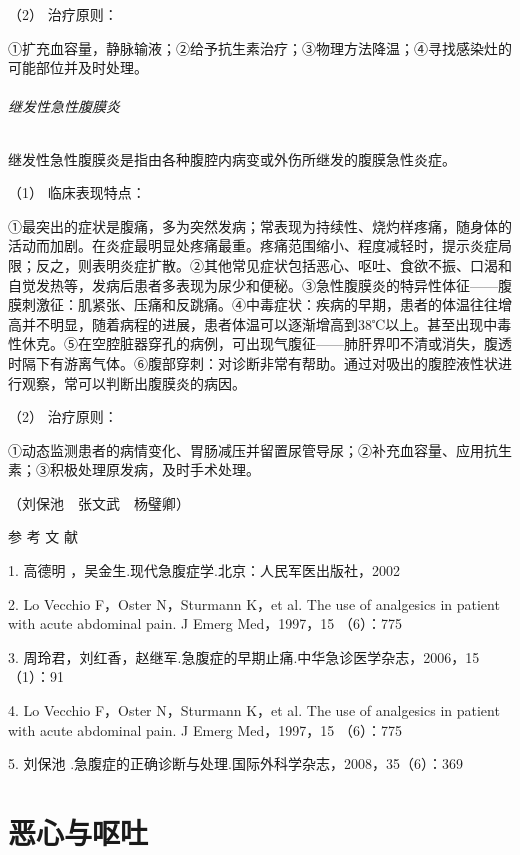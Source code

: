 \hypertarget{text00026.htmlux5cux23CHP1-10-3-2-2-2}{}
（2） 治疗原则：

①扩充血容量，静脉输液；②给予抗生素治疗；③物理方法降温；④寻找感染灶的可能部位并及时处理。

\subparagraph{继发性急性腹膜炎}

继发性急性腹膜炎是指由各种腹腔内病变或外伤所继发的腹膜急性炎症。

\hypertarget{text00026.htmlux5cux23CHP1-10-3-2-3-1}{}
（1） 临床表现特点：

①最突出的症状是腹痛，多为突然发病；常表现为持续性、烧灼样疼痛，随身体的活动而加剧。在炎症最明显处疼痛最重。疼痛范围缩小、程度减轻时，提示炎症局限；反之，则表明炎症扩散。②其他常见症状包括恶心、呕吐、食欲不振、口渴和自觉发热等，发病后患者多表现为尿少和便秘。③急性腹膜炎的特异性体征------腹膜刺激征：肌紧张、压痛和反跳痛。④中毒症状：疾病的早期，患者的体温往往增高并不明显，随着病程的进展，患者体温可以逐渐增高到38℃以上。甚至出现中毒性休克。⑤在空腔脏器穿孔的病例，可出现气腹征------肺肝界叩不清或消失，腹透时隔下有游离气体。⑥腹部穿刺：对诊断非常有帮助。通过对吸出的腹腔液性状进行观察，常可以判断出腹膜炎的病因。

\hypertarget{text00026.htmlux5cux23CHP1-10-3-2-3-2}{}
（2） 治疗原则：

①动态监测患者的病情变化、胃肠减压并留置尿管导尿；②补充血容量、应用抗生素；③积极处理原发病，及时手术处理。

（刘保池　张文武　杨璧卿）

\protect\hypertarget{text00027.html}{}{}

\hypertarget{text00027.htmlux5cux23CHP1-10-4}{}
参 考 文 献

1. 高德明 ，吴金生.现代急腹症学.北京：人民军医出版社，2002

2. Lo Vecchio F，Oster N，Sturmann K，et al. The use of analgesics in
patient with acute abdominal pain. J Emerg Med，1997，15 （6）：775

3.
周玲君，刘红香，赵继军.急腹症的早期止痛.中华急诊医学杂志，2006，15（1）：91

4. Lo Vecchio F，Oster N，Sturmann K，et al. The use of analgesics in
patient with acute abdominal pain. J Emerg Med，1997，15 （6）：775

5. 刘保池 .急腹症的正确诊断与处理.国际外科学杂志，2008，35（6）：369

\protect\hypertarget{text00028.html}{}{}

\chapter{恶心与呕吐}

